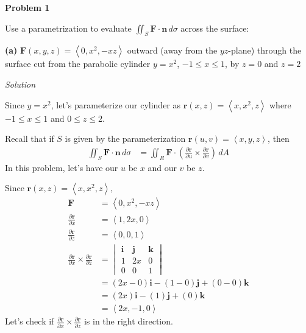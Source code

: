 \documentclass{article}
\newcommand{\lrp}[1]{\left( #1 \right)}
\newcommand{\lra}[1]{\left\langle #1 \right\rangle}
\renewcommand{\i}[0]{\mathbf{i}}
\renewcommand{\j}[0]{\mathbf{j}}
\renewcommand{\k}[0]{\mathbf{k}}
\renewcommand{\r}[0]{\mathbf{r}}
\newcommand{\F}[0]{\mathbf{F}}
\newcommand{\n}[0]{\mathbf{n}}
\newcommand{\Solution}{\textit{Solution}}
\begin{document}
{}\textbf{Problem 1}

Use a parametrization to evaluate $\displaystyle \iint_S \F\cdot \n\,d\sigma$ across the surface:

{}\textbf{(a)} $\F(x,y,z)=\lra{0,x^2,-xz}$ outward (away from the $yz$-plane) through the surface cut from the parabolic cylinder $y=x^2$, $-1\leq x\leq 1$, by $z=0$ and $z=2$

\Solution

Since $y=x^2$, let's parameterize our cylinder as $\r(x,z)=\lra{x,x^2,z}$ where $-1\leq x\leq 1$ and $0\leq z\leq 2$.

Recall that if $S$ is given by the parameterization $\r(u,v)=\lra{x,y,z}$, then
\begin{align*}
    \iint_S \F\cdot \n \,d\sigma &= \iint_R \F \cdot \lrp{\frac{\partial \r}{\partial u}\times \frac{\partial \r}{\partial v}}\,dA
\end{align*}
In this problem, let's have our $u$ be $x$ and our $v$ be $z$.

Since $\r(x,z)=\lra{x,x^2,z}$,
\begin{align*}
\F&=\lra{0,x^2,-xz}\\
    \frac{\partial \r}{\partial x}&=\lra{1,2x,0}\\
    \frac{\partial \r}{\partial z}&=\lra{0,0,1}\\
    \frac{\partial \r}{\partial x}\times \frac{\partial \r}{\partial z}&=\begin{vmatrix}\i & \j & \k \\ 1 & 2x & 0\\ 0 & 0 & 1\end{vmatrix}\\
    &=\lrp{2x-0}\i - \lrp{1 - 0}\j + \lrp{0 - 0}\k\\
    &=\lrp{2x}\i - \lrp{1}\j + \lrp{0}\k\\
    &=\lra{2x,-1,0}
\end{align*}
Let's check if $\displaystyle  \frac{\partial \r}{\partial x}\times \frac{\partial \r}{\partial z}$ is in the right direction.
\end{document}
